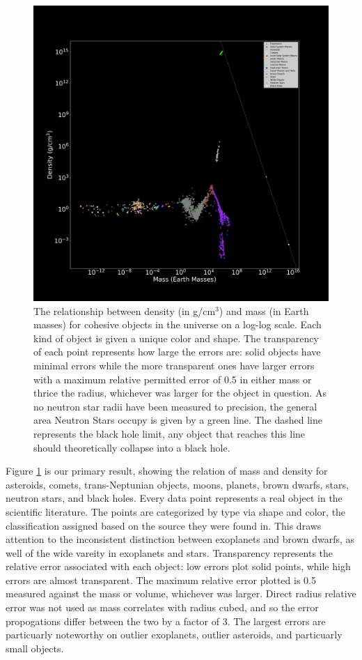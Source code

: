 \documentclass[twocolumn,linenumbers]{aastex631}
\begin{document}
\begin{figure}[htbp]
\centering
\includegraphics[scale = 0.35]{MassDensityPlot.pdf}
\centering
\caption{The relationship between density (in g/cm$^3$) and mass (in Earth masses) for cohesive objects in the universe on a log-log scale. Each kind of object is given a unique color and shape. The transparency of each point represents how large the errors are: solid objects have minimal errors while the more transparent ones have larger errors with a maximum relative permitted error of 0.5 in either mass or thrice the radius, whichever was larger for the object in question. As no  neutron star radii have been measured to precision, the general area Neutron Stars occupy is given by a green line. The dashed line represents the black hole limit, any object that reaches this line should theoretically collapse into a black hole. }
\label{fig:1}
\end{figure}

Figure \ref{fig:1} is our primary result, showing the relation of mass and density for asteroids, comets, trans-Neptunian objects, moons, planets, brown dwarfs, stars, neutron stars, and black holes. Every data point represents a real object in the scientific literature. The points are categorized by type via shape and color, the classification assigned based on the source they were found in. This draws attention to the inconsistent distinction between exoplanets and brown dwarfs, as well of the wide vareity in exoplanets and stars. Transparency represents the relative error associated with each object: low errors plot solid points, while high errors are almost transparent. The maximum relative error plotted is 0.5 measured against the mass or volume, whichever was larger. Direct radius relative error was not used as mass correlates with radius cubed, and so the error propogations differ between the two by a factor of 3. The largest errors are particuarly noteworthy on outlier exoplanets, outlier asteroids, and particuarly small objects. 
\end{document}
